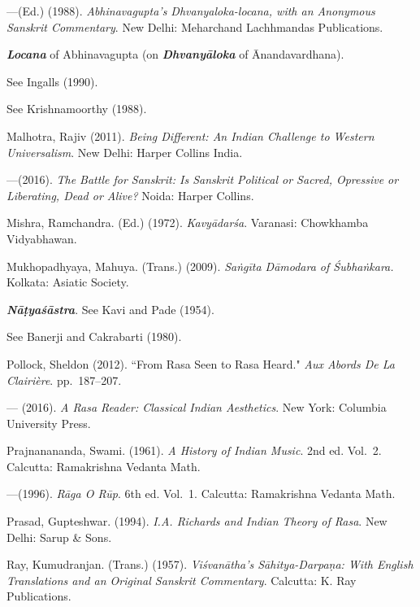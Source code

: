 \begin{thebibliography}{99}
---\kern3pt(Ed.) (1988). \textsl{Abhinavagupta's Dhvanyaloka-locana, with an Anonymous Sanskrit Commentary}. New Delhi: Meharchand Lachhmandas Publications. 

{\sl\bfseries Locana} of Abhinavagupta (on {\sl\bfseries Dhvanyāloka} of Ānandavardhana). 

See Ingalls (1990). 

See Krishnamoorthy (1988).

Malhotra, Rajiv (2011). \textsl{Being Different: An Indian Challenge to Western Universalism}. New Delhi: Harper Collins India. 

---\kern3pt(2016). \textsl{The Battle for Sanskrit: Is Sanskrit Political or Sacred, Opressive or Liberating, Dead or Alive?} Noida: Harper Collins.



Mishra, Ramchandra. (Ed.) (1972). \textsl{Kavyādarśa}. Varanasi: Chowkhamba Vidyabhawan.

Mukhopadhyaya, Mahuya. (Trans.) (2009). \textsl{Saṅgīta Dāmodara of Śubhaṅkara.} Kolkata: Asiatic Society. 

{\sl\bfseries Nāṭyaśāstra}. See Kavi and Pade (1954).


\hspace{1.25cm} See Banerji and Cakrabarti (1980).


Pollock, Sheldon (2012). ``From Rasa Seen to Rasa Heard." \textsl{Aux Abords De La Clairière}. pp.~187--207. 

--- \kern3pt(2016). \textsl{A Rasa Reader: Classical Indian Aesthetics}. New York: Columbia University Press.

Prajnanananda, Swami. (1961). \textsl{A History of Indian Music}. 2nd ed. Vol.~2. Calcutta: Ramakrishna Vedanta Math. 

---\kern3pt(1996). \textsl{Rāga O Rūp}. 6th ed. Vol.~1. Calcutta: Ramakrishna Vedanta Math. 

Prasad, Gupteshwar. (1994). \textsl{I.A. Richards and Indian Theory of Rasa}. New Delhi: Sarup \& Sons.

Ray, Kumudranjan. (Trans.) (1957). \textsl{Viśvanātha's Sāhitya-Darpaṇa: With English Translations and an Original Sanskrit Commentary}. Calcutta: K. Ray Publications. 


\end{thebibliography}
